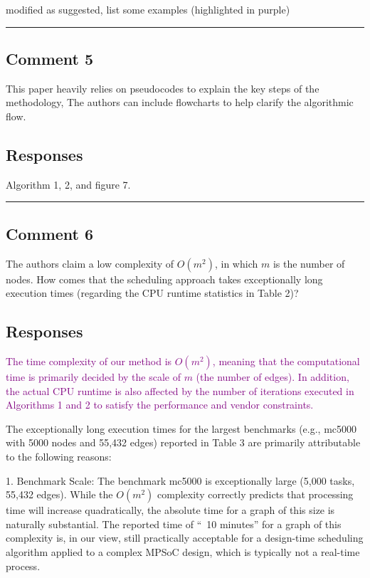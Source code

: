 \documentclass[10pt,journal, compsoc]{IEEEtran}
\begin{document}
modified as suggested, list some examples (highlighted in purple)

\noindent\rule[0.25\baselineskip]{252pt}{1pt}


\subsection*{Comment 5}
This paper heavily relies on pseudocodes to explain the key steps of the methodology, The authors can include flowcharts to help clarify the algorithmic flow.

\subsection*{Responses}

Algorithm 1, 2, and figure 7.

\noindent\rule[0.25\baselineskip]{252pt}{1pt}



\subsection*{Comment 6}
The authors claim a low complexity of $O(m^2)$, in which $m$ is the number of nodes. How comes that the scheduling approach takes exceptionally long execution times (regarding the CPU runtime statistics in Table 2)?

\subsection*{Responses}

\textcolor{purple}{The time complexity of our method is $O(m^2)$, meaning that the computational time is primarily decided by the scale of $m$ (the number of edges). In addition, the actual CPU runtime is also affected by the number of iterations executed in Algorithms 1 and 2 to satisfy the performance and vendor constraints.}


The exceptionally long execution times for the largest benchmarks (e.g., mc5000 with 5000 nodes and 55,432 edges) reported in Table 3 are primarily attributable to the following reasons:


1. Benchmark Scale: The benchmark mc5000 is exceptionally large (5,000 tasks, 55,432 edges). While the $O(m^2)$  complexity correctly predicts that processing time will increase quadratically, the absolute time for a graph of this size is naturally substantial. The reported time of ``~10 minutes'' for a graph of this complexity is, in our view, still practically acceptable for a design-time scheduling algorithm applied to a complex MPSoC design, which is typically not a real-time process.
\end{document}
